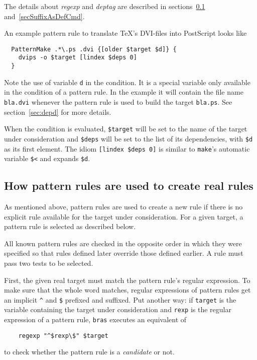 \documentclass[11pt]{scrartcl}
\newcommand{\bras}{\texttt{bras}}
\newcommand{\make}{\texttt{make}}
\begin{document}
The details about \textit{regexp} and \textit{deptag} are described
in sections~\ref{secSuffixToReal} and~\ref{secSuffixAsDefCmd}.

An example pattern rule to translate \TeX's DVI-files into PostScript
looks like
\begin{verbatim}
  PatternMake .*\.ps .dvi {[older $target $d]} {
    dvips -o $target [lindex $deps 0]
  }
\end{verbatim}
Note the use of variable \texttt{d} in the condition. It is a special
variable only available in the condition of a pattern rule. In the
example it will contain the file name \texttt{bla.dvi} whenever the
pattern rule is used to build the target \texttt{bla.ps}. See
section~\ref{sec:depd} for more details.

When the condition is evaluated, \texttt{\$target} will be set to the
name of the target under consideration and \texttt{\$deps} will be set
to the list of its dependencies, with \texttt{\$d} as its first
element. The idiom \texttt{[lindex \$deps 0]} is similar to \make's
automatic variable \texttt{\$<} and expands \texttt{\$d}.


\subsection{How pattern rules are used to create real rules}
\label{secSuffixToReal}

As mentioned above, pattern rules are used to create a new rule if
there is no explicit rule available for the target under
consideration.  For a given target, a pattern rule is selected as
described below.

All known pattern rules are checked in the opposite order in which
they were specified so that rules defined later override those defined
earlier. A rule must pass two tests to be selected.

First, the given real target must match the pattern rule's regular
expression. To make sure that the whole word matches, regular
expressions of pattern rules get an implicit \verb+^+ and \texttt{\$}
prefixed and suffixed. Put another way: if \texttt{target} is the
variable containing the target under consideration and \texttt{rexp}
is the regular expression of a pattern rule, \bras{} executes an
equivalent of
\begin{verbatim}
    regexp "^$rexp\$" $target
\end{verbatim}
to check whether the pattern rule is a \textit{candidate} or not.
\end{document}
